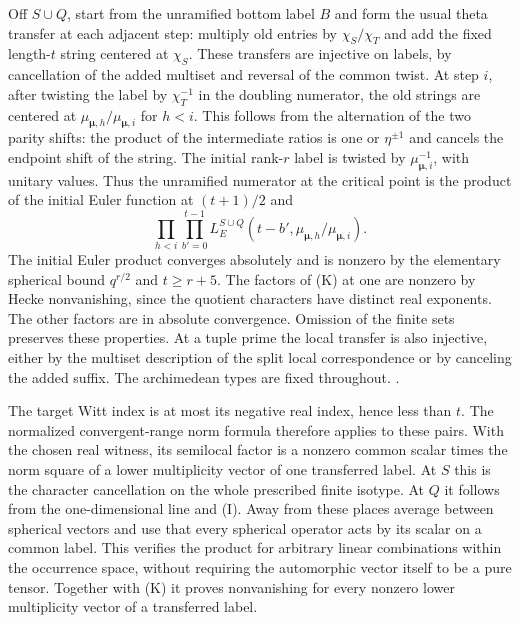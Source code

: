 Off \(S\cup Q\), start from the unramified bottom label
\(B\) and form the usual theta transfer at each adjacent
step: multiply old entries by \(\chi_S/\chi_T\) and add
the fixed length-\(t\) string centered at \(\chi_S\).
These transfers are injective on labels, by cancellation
of the added multiset and reversal of the common twist.
At step \(i\), after twisting the label by
\(\chi_T^{-1}\) in the doubling numerator, the old
strings are centered at
\(\mu_{\boldsymbol\mu,h}/\mu_{\boldsymbol\mu,i}\)
for \(h<i\). This follows from the alternation of the
two parity shifts: the product of the intermediate
ratios is one or \(\eta^{\pm1}\) and cancels the
endpoint shift of the string. The initial rank-\(r\)
label is twisted by \(\mu_{\boldsymbol\mu,i}^{-1}\),
with unitary values. Thus the unramified numerator
at the critical point is the product of the initial
Euler function at \((t+1)/2\) and
\[
 \prod_{h<i}\prod_{b'=0}^{t-1}
 L_E^{S\cup Q}(t-b',
       \mu_{\boldsymbol\mu,h}/\mu_{\boldsymbol\mu,i}).
 \tag{K}
\]
The initial Euler product converges absolutely and is
nonzero by the elementary spherical bound
\(q^{r/2}\) and \(t\ge r+5\).
The factors of (K) at one are nonzero by Hecke
nonvanishing, since the quotient characters have
distinct real exponents. The other factors are in
absolute convergence. Omission of the finite sets
preserves these properties. At a tuple prime the
local transfer is also injective, either by the
multiset description of the split local correspondence
or by canceling the added suffix. The archimedean
types are fixed throughout.
.

The target Witt index is at most its negative real
index, hence less than \(t\). The normalized
convergent-range norm formula therefore applies to
these pairs. With the chosen real witness, its
semilocal factor is a nonzero common scalar times
the norm square of a lower multiplicity vector of
one transferred label. At \(S\) this is the character
cancellation on the whole prescribed finite isotype.
At \(Q\) it follows from the one-dimensional line
and (I). Away from these places average between
spherical vectors and use that every spherical
operator acts by its scalar on a common label.
This verifies the product for arbitrary linear
combinations within the occurrence space, without
requiring the automorphic vector itself to be a
pure tensor. Together with (K) it proves
nonvanishing for every nonzero lower multiplicity
vector of a transferred label.

